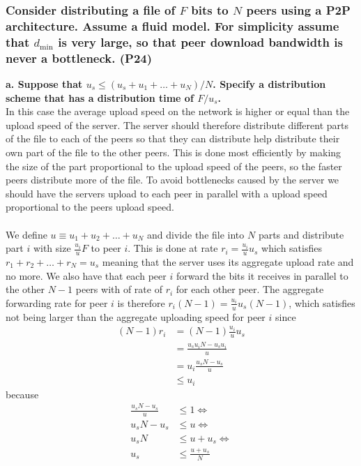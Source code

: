 \subsubsection{Consider distributing a file of $F$ bits to $N$ peers using a P2P architecture. Assume a fluid model. For simplicity assume that $d_\text{min}$ is very large, so that peer download bandwidth is never a bottleneck. (P24)}

\textbf{a. Suppose that $u_s \leq (u_s + u_1 + \dots + u_N)/N$. Specify a distribution scheme that has a distribution time of $F/u_s$.} \\
In this case the average upload speed on the network is higher or equal than the upload speed of the server. The server should therefore distribute different parts of the file to each of the peers so that they can distribute help distribute their own part of the file to the other peers. This is done most efficiently by making the size of the part proportional to the upload speed of the peers, so the faster peers distribute more of the file. To avoid bottlenecks caused by the server we should have the servers upload to each peer in parallel with a upload speed proportional to the peers upload speed. \\
\\
We define $u \equiv u_1 + u_2 + \dots + u_N$ and divide the file into $N$ parts and distribute part $i$ with size $\frac{u_i}{u}F$ to peer $i$. This is done at rate $r_i = \frac{u_i}{u}u_s$ which satisfies $r_1 + r_2 + \dots + r_N = u_s$ meaning that the server uses its aggregate upload rate and no more. We also have that each peer $i$ forward the bits it receives in parallel to the other $N-1$ peers with of rate of $r_i$ for each other peer. The aggregate forwarding rate for peer $i$ is therefore $r_i(N-1) = \frac{u_i}{u}u_s(N-1)$, which satisfies not being larger than the aggregate uploading speed for peer $i$ since
\begin{equation*}
\begin{split}
    (N-1)r_i &= (N-1)\frac{u_i}{u}u_s \\
    &= \frac{u_s u_i N - u_s u_i}{u} \\
    &= u_i \frac{u_s N - u_s}{u} \\
    &\leq u_i
\end{split}
\end{equation*}
because
\begin{equation*}
\begin{split}
    \frac{u_s N - u_s}{u} &\leq 1 \Longleftrightarrow \\
    u_s N - u_s &\leq u \Longleftrightarrow \\
    u_s N &\leq u + u_s \Longleftrightarrow \\
    u_s &\leq \frac{u + u_s}{N}
\end{split}
\end{equation*}
